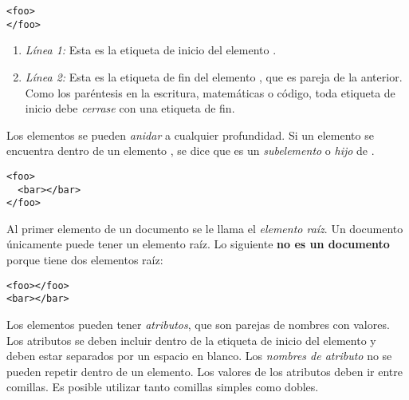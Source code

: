 \noindent\begin{minipage}{\textwidth}
\begin{lstlisting}[mathescape=True]
<foo>
</foo>
\end{lstlisting}
\end{minipage}

\begin{enumerate}

\item \emph{Línea 1:} Esta es la etiqueta de inicio del elemento .

\item \emph{Línea 2:} Esta es la etiqueta de fin del elemento , que es pareja de la anterior. Como los paréntesis en la escritura, matemáticas o código, toda etiqueta de inicio debe \emph{cerrase} con una etiqueta de fin.

\end{enumerate}

Los elementos se pueden \emph{anidar} a cualquier profundidad. Si un elemento  se encuentra dentro de un elemento , se dice que  es un \emph{subelemento} o \emph{hijo} de .

\noindent\begin{minipage}{\textwidth}
\begin{lstlisting}[mathescape=True]
<foo>
  <bar></bar>
</foo>
\end{lstlisting}
\end{minipage}

Al primer elemento de un documento  se le llama el \emph{elemento raíz}. Un documento  únicamente puede tener un elemento raíz. Lo siguiente \textbf{no es un documento } porque tiene dos elementos raíz:

\noindent\begin{minipage}{\textwidth}
\begin{lstlisting}[mathescape=True]
<foo></foo>
<bar></bar>
\end{lstlisting}
\end{minipage}

Los elementos pueden tener \emph{atributos}, que son parejas de nombres con valores. Los atributos se deben incluir dentro de la etiqueta de inicio del elemento y deben estar separados por un espacio en blanco. Los \emph{nombres de atributo} no se pueden repetir dentro de un elemento. Los valores de los atributos deben ir entre comillas. Es posible utilizar tanto comillas simples como dobles.


